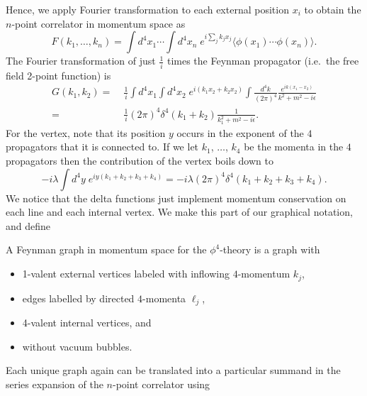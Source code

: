 \documentclass[12pt]{article}
\begin{document}
Hence, we apply Fourier transformation to each external position $x_i$
to obtain the $n$-point correlator in momentum space as
\begin{equation} 
  F(k_1, \dots, k_n) = 
  \int d^4x_1 \cdots 
  \int d^4x_n \;
  e^{i \sum_j k_j x_j}
  \langle \phi(x_1) \cdots \phi(x_n) \rangle.
\end{equation}
The Fourier transformation of just $\frac{1}{i}$ times the Feynman
propagator (i.e.\ the free field 2-point function) is
\begin{equation}
  \begin{split}
    G(k_1, k_2) =&\;
    \frac{1}{i}
    \int d^4x_1 \int d^4x_2\;
    e^{i( k_1 x_2 + k_2 x_2)}
    \int \frac{d^4k}{(2\pi)^4}
    \frac{e^{i k (x_1-x_2)}}{k^2 + m^2 -i\epsilon}    
    \\ =&\;
    \frac{1}{i}
    (2\pi)^4 \delta^4(k_1+k_2) \frac{1}{k_1^2 + m^2 - i\epsilon}.
  \end{split}
\end{equation}
For the vertex, note that its position $y$ occurs in the exponent of
the $4$ propagators that it is connected to. If we let $k_1$, $\dots$,
$k_4$ be the momenta in the $4$ propagators then the contribution of
the vertex boils down to
\begin{equation}
  -i \lambda \int d^4y \; e^{iy(k_1+k_2 + k_3 + k_4)}
  =
  -i \lambda (2\pi)^4 \delta^4(k_1+k_2 + k_3 + k_4).
\end{equation}
We notice that the delta functions just implement momentum
conservation on each line and each internal vertex. We make this part
of our graphical notation, and define
\begin{definition}
  A Feynman graph in momentum space for the $\phi^4$-theory is a graph
  with
  \begin{itemize}
  \item 1-valent external vertices labeled with inflowing
    $4$-momentum $k_j$,
  \item edges labelled by directed $4$-momenta $\ell_j$,
  \item 4-valent internal vertices, and
  \item without vacuum bubbles.
  \end{itemize}
\end{definition}
Each unique graph again can be translated into a particular summand in
the series expansion of the $n$-point correlator using 
\end{document}
